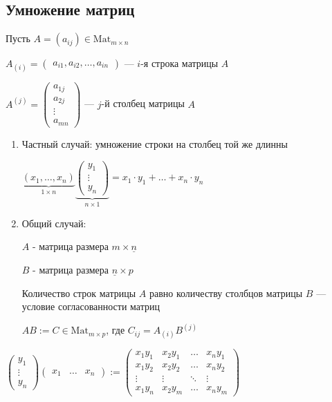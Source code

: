 \subsection{Умножение матриц}

Пусть $A = (a_{ij}) \in \text{Mat}_{m \times n}$

\bigskip

$A_{(i)} = \begin{pmatrix} a_{i1}, a_{i2}, \dots, a_{in} \end{pmatrix} $ --- $i$-я строка матрицы $A$

$A^{(j)} = \begin{pmatrix} a_{1j} \\ a_{2j} \\ \vdots \\ a_{mn} \end{pmatrix} $ --- $j$-й  столбец матрицы $A$

\begin{enumerate}[label=\arabic*)]
    \item 
        Частный случай: умножение строки на столбец той же длинны
    
        $\underbrace{(x_1, \dots, x_n)}_{1 \times n} 
        \underbrace{\begin{pmatrix}
            y_1 \\ \vdots \\ y_n
        \end{pmatrix}}_{n \times 1} 
        = x_1 \cdot y_1 + \dots + x_n \cdot y_n$
        
    \item
        Общий случай:

        $A$ - матрица размера $m \times \underline{n}$
        
        $B$ - матрица размера $\underline{n} \times p$
        
        Количество строк матрицы $A$ равно количеству столбцов матрицы $B$ --- условие согласованности матриц
        
        $AB := C \in \text{Mat}_{m \times p}$, где $C_{ij} = A_{(i)} B^{(j)}$
\end{enumerate}

\begin{example}
    \( \begin{pmatrix}
        y_1 \\ \vdots \\ y_n
    \end{pmatrix} 
    \begin{pmatrix}
        x_1 & \dots & x_n
    \end{pmatrix}
    := 
    \begin{pmatrix}
        x_1 y_1 & x_2 y_1 & \dots & x_n y_1 \\
        x_1 y_2 & x_2 y_2 & \dots & x_n y_2 \\
        \vdots & \vdots & \ddots & \vdots \\
        x_1 y_n & x_2 y_m & \dots & x_n y_m 
    \end{pmatrix} \)
\end{example}

